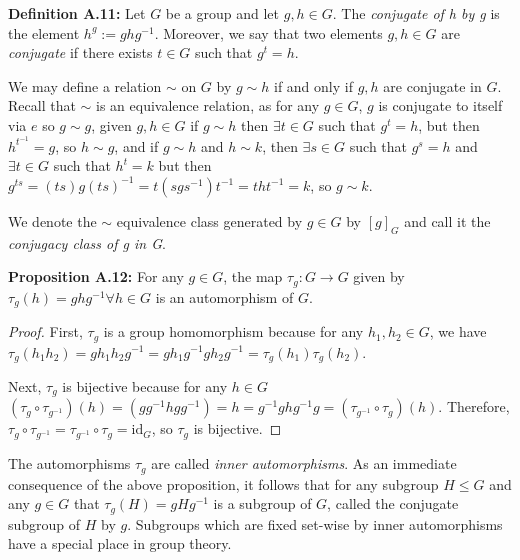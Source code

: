 \documentclass[12pt]{article}
\newcommand{\vs}{\vskip10pt}
\begin{document}
	\vs 
	
	\textbf{Definition A.11: } Let $G$ be a group and let $g,h \in G$. The \textit{conjugate of h by g} is the element $h^g := ghg^{-1}$. Moreover, we say that two elements $g,h \in G$ are \textit{conjugate} if there exists $t \in G$ such that $g^t = h$. 
	
	\vs 
	
	We may define a relation $\sim$ on $G$ by $g \sim h$ if and only if $g,h$ are conjugate in $G$. Recall that $\sim$ is an equivalence relation, as for any $g \in G$, $g$ is conjugate to itself via $e$ so $g \sim g$, given $g,h \in G$ if $g \sim h$ then $\exists t \in G$ such that $g^t = h$, but then $h^{t^{-1}} = g$, so $h \sim g$, and if $g \sim h$ and $h \sim k$, then $\exists s \in G$ such that $g^s = h$ and $\exists t \in G$ such that $h^t = k$ but then $g^{ts} = (ts)g(ts)^{-1} = t(sgs^{-1})t^{-1} = tht^{-1} = k$, so $g \sim k$. 
	
	\vs 
	
	We denote the $\sim$ equivalence class generated by $g \in G$ by $[g]_G$ and call it the \textit{conjugacy class of g in G}. 
	
	\vs 
	
	\textbf{Proposition A.12: } For any $g \in G$, the map $\tau_g: G \rightarrow G$ given by $\tau_g(h) = ghg^{-1} \forall h \in G$ is an automorphism of $G$. 
	
	\begin{proof}
		
		First, $\tau_g$ is a group homomorphism because for any $h_1, h_2 \in G$, we have $\tau_g(h_1 h_2) = g h_1 h_2 g^{-1} = g h_1 g^{-1} g h_2 g^{-1} = \tau_g(h_1) \tau_g(h_2)$. 
		
		\vs 
		
		Next, $\tau_g$ is bijective because for any $h \in G$ $(\tau_g \circ \tau_{g^{-1}}) (h) = (g g^{-1} h g g^{-1}) = h = g^{-1} g h g^{-1} g = (\tau_{g^{-1}} \circ \tau_{g}) (h)$. Therefore, $\tau_g \circ \tau_{g^{-1}} = \tau_{g^{-1}} \circ \tau_g = \text{id}_G$, so $\tau_g$ is bijective. 
		
	\end{proof}
	
	The automorphisms $\tau_g$ are called \textit{inner automorphisms}. As an immediate consequence of the above proposition, it follows that for any subgroup $H \leq G$ and any $g \in G$ that $\tau_g(H) = gHg^{-1}$ is a subgroup of $G$, called the conjugate subgroup of $H$ by $g$. Subgroups which are fixed set-wise by inner automorphisms have a special place in group theory. 
	
\end{document}

